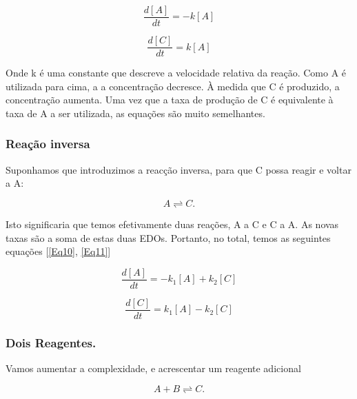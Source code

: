 \documentclass[11pt, letterpaper, portuguese]{article}
\begin{document}
    \begin{equation}
        \frac{d [A]}{d t}=-k[A]
        \label{Eq7}
    \end{equation}

    \begin{equation}
        \frac{d [C]}{d t}=k[A]
        \label{Eq8}
    \end{equation}
    
    \par{Onde k é uma constante que descreve a velocidade relativa da reação. Como A é utilizada para cima, a a concentração decresce. À medida que C é produzido, a concentração aumenta. Uma vez que a taxa de produção de C é equivalente à taxa de A a ser utilizada, as equações são muito semelhantes.}

    \subsubsection{Reação inversa}

    \par{Suponhamos que introduzimos a reacção inversa, para que C possa reagir e voltar a A:}

    \begin{equation}
        A \rightleftharpoons C.
    \end{equation}

    \par{Isto significaria que temos efetivamente duas reações, A a C e C a A. As novas taxas são a soma de estas duas EDOs. Portanto, no total, temos as seguintes equações [\ref{Eq10}, \ref{Eq11}]}

    \begin{equation}
        \frac{d [A]}{d t}=-k_1[A]+k_2[C]
         \label{Eq10}
    \end{equation}


    \begin{equation}
        \frac{d [C]}{d t}=k_1[A]-k_2[C]
         \label{Eq11}
    \end{equation}

    \subsubsection{Dois Reagentes.}

    \par{Vamos aumentar a complexidade, e acrescentar um reagente adicional}

    \begin{equation}
        A+B \rightleftharpoons C.
        \label{eq12}
    \end{equation}
\end{document}
